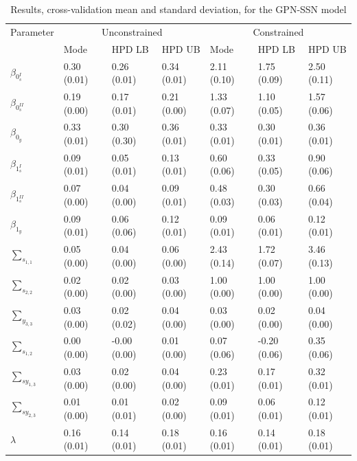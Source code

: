 \documentclass[12pt,]{article}
\begin{document}
\begin{table}
\caption{\label{tab:estCLGPNM}Results, cross-validation mean and standard deviation, for the GPN-SSN model}
\centering
\begin{tabular}[t]{lllllll}
\toprule
\multicolumn{1}{c}{Parameter} & \multicolumn{3}{c}{Unconstrained} & \multicolumn{3}{c}{Constrained} \\
\cmidrule(l{2pt}r{2pt}){1-1} \cmidrule(l{2pt}r{2pt}){2-4} \cmidrule(l{2pt}r{2pt}){5-7}
  & Mode & HPD LB & HPD UB & Mode & HPD LB & HPD UB\\
\midrule
$\beta_{0_s^{I}}$ & 0.30 (0.01) & 0.26 (0.01) & 0.34 (0.01) & 2.11 (0.10) & 1.75 (0.09) & 2.50 (0.11)\\
$\beta_{0_s^{II}}$ & 0.19 (0.00) & 0.17 (0.01) & 0.21 (0.00) & 1.33 (0.07) & 1.10 (0.05) & 1.57 (0.06)\\
$\beta_{0_y}$ & 0.33 (0.01) & 0.30 (0.30) & 0.36 (0.01) & 0.33 (0.01) & 0.30 (0.01) & 0.36 (0.01)\\
$\beta_{1_s^{I}}$ & 0.09 (0.01) & 0.05 (0.01) & 0.13 (0.01) & 0.60 (0.06) & 0.33 (0.05) & 0.90 (0.06)\\
$\beta_{1_s^{II}}$ & 0.07 (0.00) & 0.04 (0.00) & 0.09 (0.01) & 0.48 (0.03) & 0.30 (0.03) & 0.66 (0.04)\\
\addlinespace
$\beta_{1_y}$ & 0.09 (0.01) & 0.06 (0.06) & 0.12 (0.01) & 0.09 (0.01) & 0.06 (0.01) & 0.12 (0.01)\\
$\sum_{s_{1,1}}$ & 0.05 (0.00) & 0.04 (0.00) & 0.06 (0.00) & 2.43 (0.14) & 1.72 (0.07) & 3.46 (0.13)\\
$\sum_{s_{2,2}}$ & 0.02 (0.00) & 0.02 (0.00) & 0.03 (0.00) & 1.00 (0.00) & 1.00 (0.00) & 1.00 (0.00)\\
$\sum_{y_{3,3}}$ & 0.03 (0.00) & 0.02 (0.02) & 0.04 (0.00) & 0.03 (0.00) & 0.02 (0.00) & 0.04 (0.00)\\
$\sum_{s_{1,2}}$ & 0.00 (0.00) & -0.00 (0.00) & 0.01 (0.00) & 0.07 (0.06) & -0.20 (0.06) & 0.35 (0.06)\\
\addlinespace
$\sum_{sy_{1,3}}$ & 0.03 (0.00) & 0.02 (0.00) & 0.04 (0.00) & 0.23 (0.01) & 0.17 (0.01) & 0.32 (0.01)\\
$\sum_{sy_{2,3}}$ & 0.01 (0.00) & 0.01 (0.01) & 0.02 (0.00) & 0.09 (0.01) & 0.06 (0.01) & 0.12 (0.01)\\
$\lambda$ & 0.16 (0.01) & 0.14 (0.01) & 0.18 (0.01) & 0.16 (0.01) & 0.14 (0.01) & 0.18 (0.01)\\
\bottomrule
\end{tabular}
\end{table}
\end{document}

